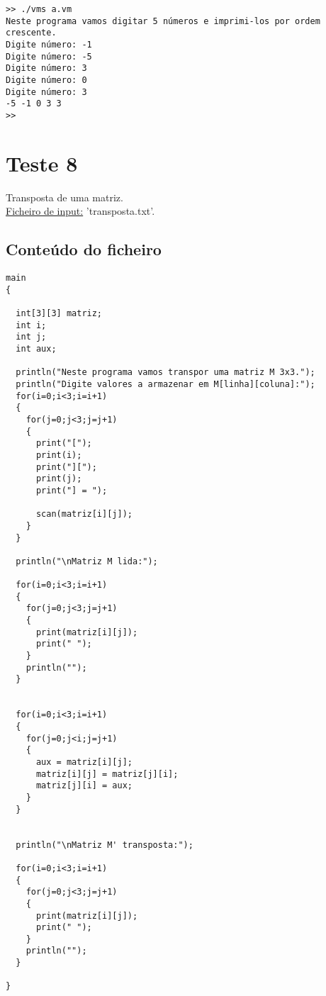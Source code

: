 \documentclass[11pt,a4paper]{report}%
\begin{document}
\begin{verbatim}
>> ./vms a.vm
Neste programa vamos digitar 5 números e imprimi-los por ordem crescente.
Digite número: -1
Digite número: -5
Digite número: 3
Digite número: 0
Digite número: 3
-5 -1 0 3 3 
>>
\end{verbatim} 

\section{Teste 8}
Transposta de uma matriz. \\
\underline{Ficheiro de input:} 'transposta.txt'.

\subsection{Conteúdo do ficheiro}

\begin{verbatim}
main
{
  
  int[3][3] matriz;
  int i;
  int j;
  int aux;

  println("Neste programa vamos transpor uma matriz M 3x3.");
  println("Digite valores a armazenar em M[linha][coluna]:");
  for(i=0;i<3;i=i+1)
  {
    for(j=0;j<3;j=j+1)
    {
      print("[");
      print(i);
      print("][");
      print(j);
      print("] = ");

      scan(matriz[i][j]);
    }
  }

  println("\nMatriz M lida:");

  for(i=0;i<3;i=i+1)
  {
    for(j=0;j<3;j=j+1)
    {
      print(matriz[i][j]);
      print(" ");
    }
    println("");
  }


  for(i=0;i<3;i=i+1)
  {
    for(j=0;j<i;j=j+1)
    {
      aux = matriz[i][j];
      matriz[i][j] = matriz[j][i];
      matriz[j][i] = aux;
    }
  } 


  println("\nMatriz M' transposta:");

  for(i=0;i<3;i=i+1)
  {
    for(j=0;j<3;j=j+1)
    {
      print(matriz[i][j]);
      print(" ");
    }
    println("");
  } 

}
\end{verbatim}
\end{document}
